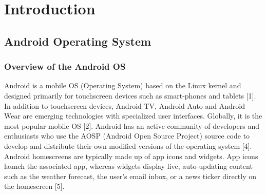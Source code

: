 \documentclass[12pt]{uthesis-v12}  %
\begin{document}

\chapter{Introduction}

	\section{Android Operating System}
		
		\subsection{Overview of the Android OS}
			Android is a mobile OS (Operating System) based on the Linux kernel and designed primarily for touchscreen devices such as smart-phones and tablets [1]. In addition to touchscreen devices, Android TV, Android Auto and Android Wear are emerging technologies with specialized user interfaces. Globally, it is the most popular mobile OS [2]. Android has an active community of developers and enthusiasts who use the AOSP (Android Open Source Project) source code to develop and distribute their own modified versions of the operating system [4]. Android homescreens are typically made up of app icons and widgets. App icons launch the associated app, whereas widgets display live, auto-updating content such as the weather forecast, the user's email inbox, or a news ticker directly on the homescreen [5].
			
\end{document}
